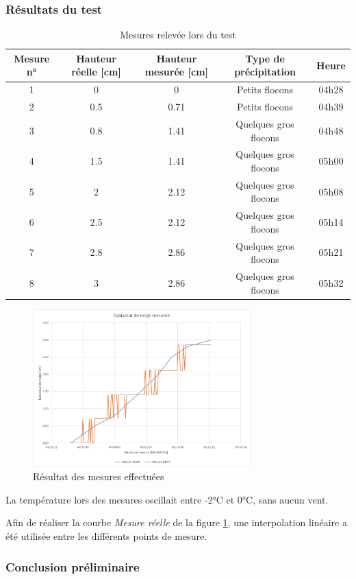\subsubsection{Résultats du test}

\begin{table}[H]
    \centering
    \begin{tabular}{|c|c|c|c|c|}
        \hline
        Mesure n° & Hauteur réelle [cm] & Hauteur mesurée [cm] & Type de précipitation & Heure \\
        \hline\hline
        1 & 0 & 0 & Petits flocons & 04h28 \\
        \hline
        2 & 0.5 & 0.71 & Petits flocons & 04h39 \\
        \hline
        3 & 0.8 & 1.41 & Quelques gros flocons & 04h48 \\
        \hline
        4 & 1.5 & 1.41 & Quelques gros flocons & 05h00 \\
        \hline
        5 & 2 & 2.12 & Quelques gros flocons & 05h08 \\
        \hline
        6 & 2.5 & 2.12 & Quelques gros flocons & 05h14 \\
        \hline
        7 & 2.8 & 2.86 & Quelques gros flocons & 05h21 \\
        \hline
        8 & 3 & 2.86 & Quelques gros flocons & 05h32 \\
        \hline
        
    \end{tabular}
    \caption{Mesures relevée lors du test}
    \label{SnowingState}
\end{table}

\begin{figure}[H]
    \centering
    \includegraphics[width=0.75\textwidth]{Images/LiDAR/ReadTests_Results.png}
    \caption{Résultat des mesures effectuées}
    \label{RealTest_Results}
\end{figure}

La température lors des mesures oscillait entre -2°C et 0°C, sans aucun vent.\par 
Afin de réaliser la courbe \emph{Mesure réelle} de la figure \ref{RealTest_Results}, une interpolation
linéaire a été utilisée entre les différents points de mesure.

\subsubsection{Conclusion préliminaire} 

